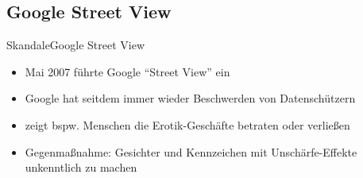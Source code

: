 \documentclass[9pt]{beamer}
\begin{document}
        \subsection{Google Street View}
            \begin{frame}{Skandale}{Google Street View}
                \begin{itemize}
            		\item Mai 2007 führte Google \enquote{Street View} ein
            		\item Google hat seitdem immer wieder Beschwerden von Datenschützern
            		\item zeigt bspw. Menschen die Erotik-Geschäfte betraten oder verließen
            		\item Gegenmaßnahme: Gesichter und Kennzeichen mit Unschärfe-Effekte unkenntlich zu machen
            	\end{itemize}
            \end{frame}
\end{document}
